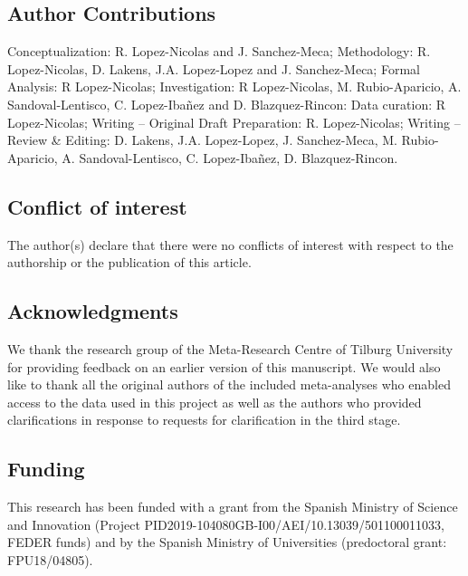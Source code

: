\documentclass[
  ,apa7,floatsintext]{apa6}
\begin{document}
\hypertarget{author-contributions}{%
\subsection{Author Contributions}\label{author-contributions}}

Conceptualization: R. Lopez-Nicolas and J. Sanchez-Meca; Methodology: R. Lopez-Nicolas, D. Lakens, J.A. Lopez-Lopez and J. Sanchez-Meca; Formal Analysis: R Lopez-Nicolas; Investigation: R Lopez-Nicolas, M. Rubio-Aparicio, A. Sandoval-Lentisco, C. Lopez-Ibañez and D. Blazquez-Rincon: Data curation: R Lopez-Nicolas; Writing -- Original Draft Preparation: R. Lopez-Nicolas; Writing -- Review \& Editing: D. Lakens, J.A. Lopez-Lopez, J. Sanchez-Meca, M. Rubio-Aparicio, A. Sandoval-Lentisco, C. Lopez-Ibañez, D. Blazquez-Rincon.

\hypertarget{conflict-of-interest}{%
\subsection{Conflict of interest}\label{conflict-of-interest}}

The author(s) declare that there were no conflicts of interest with respect to the authorship or the publication of this article.

\hypertarget{acknowledgments}{%
\subsection{Acknowledgments}\label{acknowledgments}}

We thank the research group of the Meta-Research Centre of Tilburg University for providing feedback on an earlier version of this manuscript. We would also like to thank all the original authors of the included meta-analyses who enabled access to the data used in this project as well as the authors who provided clarifications in response to requests for clarification in the third stage.

\hypertarget{funding}{%
\subsection{Funding}\label{funding}}

This research has been funded with a grant from the Spanish Ministry of Science and Innovation (Project PID2019-104080GB-I00/AEI/10.13039/501100011033, FEDER funds) and by the Spanish Ministry of Universities (predoctoral grant: FPU18/04805).
\end{document}
